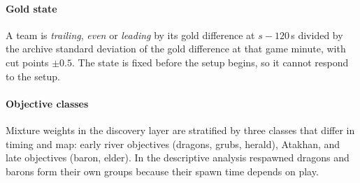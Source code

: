 \paragraph*{Gold state}
A team is \emph{trailing}, \emph{even} or \emph{leading} by its gold difference at $s{-}120$\,s divided by the archive standard deviation of the gold difference at that game minute, with cut points $\pm 0.5$.
The state is fixed before the setup begins, so it cannot respond to the setup.

\paragraph*{Objective classes}
Mixture weights in the discovery layer are stratified by three classes that differ in timing and map: early river objectives (dragons, grubs, herald), Atakhan, and late objectives (baron, elder).
In the descriptive analysis respawned dragons and barons form their own groups because their spawn time depends on play.
